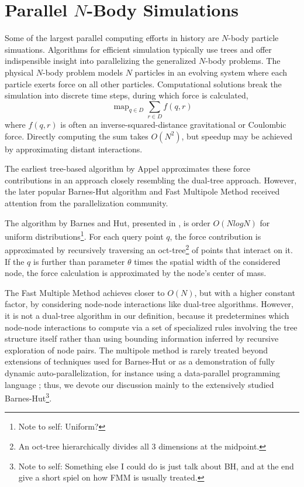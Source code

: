 \documentclass[times, leqno,twocolumn]{article}
\newcommand{\authornote}[1]{\footnote{Note to self: #1}}
\DeclareMathOperator*{\map}{map}
\begin{document}
\section{Parallel $N$-Body Simulations}

Some of the largest parallel computing efforts in history are $N$-body particle simuations.
Algorithms for efficient simulation typically use trees and offer indispensible insight into parallelizing the generalized $N$-body problems.
The physical $N$-body problem models $N$ particles in an evolving system where each particle exerts force on all other particles.
Computational solutions break the simulation into discrete time steps, during which force is calculated,
\[\map_{q \in D} \sum_{r \in D} f(q,r)\]
\noindent where $f(q,r)$ is often an inverse-squared-distance gravitational or Coulombic force.
Directly computing the sum takes $O(N^2)$, but speedup may be achieved by approximating distant interactions.

The earliest tree-based algorithm by Appel \cite{appel} approximates these force contributions in an approach closely resembling the dual-tree approach.
However, the later popular Barnes-Hut algorithm\cite{barneshut} and Fast Multipole Method\cite{greengard_fmm} received attention from the parallelization community.

The algorithm by Barnes and Hut, presented in \cite{barneshut}, is order $O(N log N)$ for uniform distributions\authornote{Uniform?}.
For each query point $q$, the force contribution is approximated by recursively traversing an oct-tree\footnote{An oct-tree hierarchically divides all 3 dimensions at the midpoint.} of points that interact on it.
If the $q$ is further than parameter $\theta$ times the spatial width of the considered node, the force calculation is approximated by the node's center of mass.

The Fast Multiple Method \cite{greengard_fmm} achieves closer to $O(N)$, but with a higher constant factor, by considering node-node interactions like dual-tree algorithms.
However, it is not a dual-tree algorithm in our definition, because it predetermines which node-node interactions to compute via a set of specialized rules involving the tree structure itself rather than using bounding information inferred by recursive exploration of node pairs.
The multipole method is rarely treated beyond extensions of techniques used for Barnes-Hut \cite{singh95load} or as a demonstration of fully dynamic auto-parallelization, for instance using a data-parallel programming language \cite{nyland93dataparallel} \cite{washington_nesl}; thus, we devote our discussion mainly to the extensively studied Barnes-Hut\authornote{Something else I could do is just talk about BH, and at the end give a short spiel on how FMM is usually treated.}.
\end{document}
